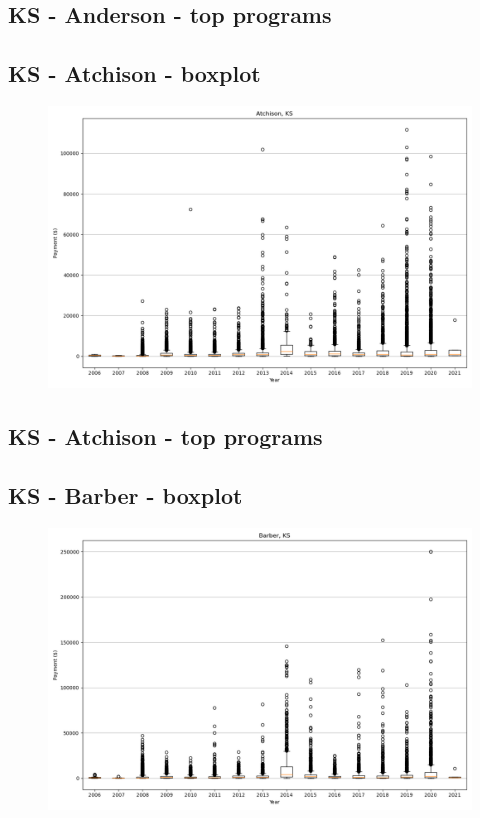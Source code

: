 \subsection*{KS - Anderson - top programs}

\newpage
\subsection*{KS - Atchison - boxplot}
\begin{figure}[h]
\centering
\includegraphics[width=7in]{../output/boxplots/counties/Atchison-KS_boxplot.png}
\end{figure}


\subsection*{KS - Atchison - top programs}

\newpage
\subsection*{KS - Barber - boxplot}
\begin{figure}[h]
\centering
\includegraphics[width=7in]{../output/boxplots/counties/Barber-KS_boxplot.png}
\end{figure}


